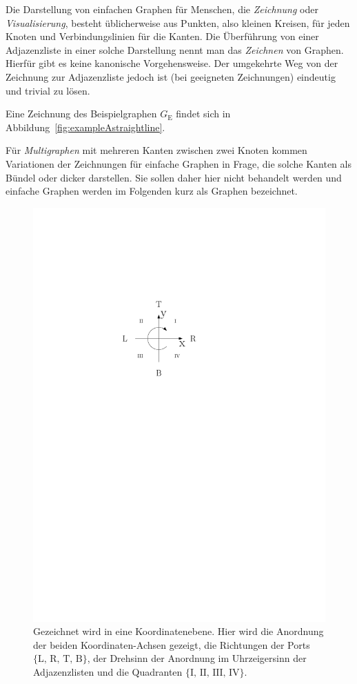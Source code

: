 \documentclass[a4paper]{scrreprt}
\theoremstyle{definition}
\begin{document}
Die Darstellung von einfachen Graphen für Menschen, die \emph{Zeichnung} oder \emph{Visualisierung}, besteht üblicherweise aus Punkten, also kleinen Kreisen, für jeden Knoten und Verbindungslinien für die Kanten. Die Überführung von einer Adjazenzliste in einer solche Darstellung nennt man das \emph{Zeichnen} von Graphen. Hierfür gibt es keine kanonische Vorgehensweise. Der umgekehrte Weg von der Zeichnung zur Adjazenzliste jedoch ist (bei geeigneten Zeichnungen) eindeutig und trivial zu lösen.

Eine Zeichnung des Beispielgraphen $G_\text{E}$ findet sich in Abbildung~\ref{fig:exampleAstraightline}.

Für \emph{Multigraphen} mit mehreren Kanten zwischen zwei Knoten kommen Variationen der Zeichnungen für einfache Graphen in Frage, die solche Kanten als Bündel oder dicker darstellen. Sie sollen daher hier nicht behandelt werden und einfache Graphen werden im Folgenden kurz als Graphen bezeichnet.

\begin{figure}[h]
  \centering
  \includegraphics[scale=.6]{koordinatengitter}
  \caption{Gezeichnet wird in eine Koordinatenebene. Hier wird die Anordnung der beiden Koordinaten-Achsen gezeigt, die Richtungen der Ports $\{\text{L, R, T, B}\}$, der Drehsinn der Anordnung im Uhrzeigersinn der Adjazenzlisten und die Quadranten $\{\text{I, II, III, IV}\}$.}
  \label{fig:coords}
\end{figure}
\end{document}
